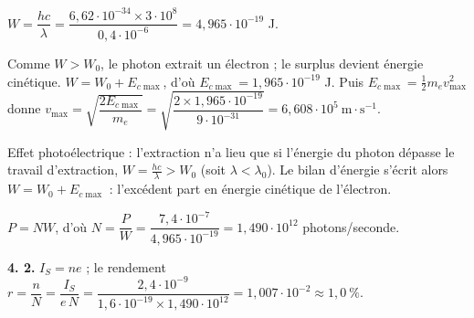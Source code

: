 \documentclass[11pt]{article}
\begin{document}
 $W = \dfrac{hc}{\lambda} = \dfrac{6{,}62\cdot10^{-34}\times 3\cdot10^{8}}{0{,}4\cdot10^{-6}} = 4{,}965\cdot10^{-19}$ J.

 Comme $W > W_0$, le photon extrait un électron ; le surplus devient énergie cinétique. $W = W_0 + E_{c\max}$, d'où $E_{c\max} = 1{,}965\cdot10^{-19}$ J. Puis $E_{c\max} = \frac{1}{2}m_e v_{\max}^2$ donne $v_{\max} = \sqrt{\dfrac{2E_{c\max}}{m_e}} = \sqrt{\dfrac{2\times 1{,}965\cdot10^{-19}}{9\cdot10^{-31}}} = 6{,}608\cdot10^{5}\ \text{m}\cdot\text{s}^{-1}$.

\begin{rappel}
Effet photoélectrique : l'extraction n'a lieu que si l'énergie du
photon dépasse le travail d'extraction, $W = \frac{hc}{\lambda} > W_0$
(soit $\lambda < \lambda_0$). Le bilan d'énergie s'écrit alors
$W = W_0 + E_{c\max}$ : l'excédent part en énergie cinétique de
l'électron.
\end{rappel}

 $P = NW$, d'où $N = \dfrac{P}{W} = \dfrac{7{,}4\cdot10^{-7}}{4{,}965\cdot10^{-19}} = 1{,}490\cdot10^{12}$ photons/seconde.

\textbf{4. 2.} $I_S = ne$ ; le rendement $r = \dfrac{n}{N} = \dfrac{I_S}{e\,N} = \dfrac{2{,}4\cdot10^{-9}}{1{,}6\cdot10^{-19}\times 1{,}490\cdot10^{12}} = 1{,}007\cdot10^{-2} \approx 1{,}0\ \%$.
\end{document}

